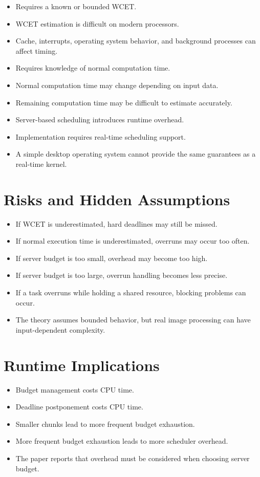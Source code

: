 \documentclass[a4paper,11pt]{article}
\begin{document}
\begin{itemize}
    \item Requires a known or bounded WCET.
    \item WCET estimation is difficult on modern processors.
    \item Cache, interrupts, operating system behavior, and background processes can affect timing.
    \item Requires knowledge of normal computation time.
    \item Normal computation time may change depending on input data.
    \item Remaining computation time may be difficult to estimate accurately.
    \item Server-based scheduling introduces runtime overhead.
    \item Implementation requires real-time scheduling support.
    \item A simple desktop operating system cannot provide the same guarantees as a real-time kernel.
\end{itemize}

\section*{Risks and Hidden Assumptions}

\begin{itemize}
    \item If WCET is underestimated, hard deadlines may still be missed.
    \item If normal execution time is underestimated, overruns may occur too often.
    \item If server budget is too small, overhead may become too high.
    \item If server budget is too large, overrun handling becomes less precise.
    \item If a task overruns while holding a shared resource, blocking problems can occur.
    \item The theory assumes bounded behavior, but real image processing can have input-dependent complexity.
\end{itemize}

\section*{Runtime Implications}

\begin{itemize}
    \item Budget management costs CPU time.
    \item Deadline postponement costs CPU time.
    \item Smaller chunks lead to more frequent budget exhaustion.
    \item More frequent budget exhaustion leads to more scheduler overhead.
    \item The paper reports that overhead must be considered when choosing server budget.
\end{itemize}
\end{document}
